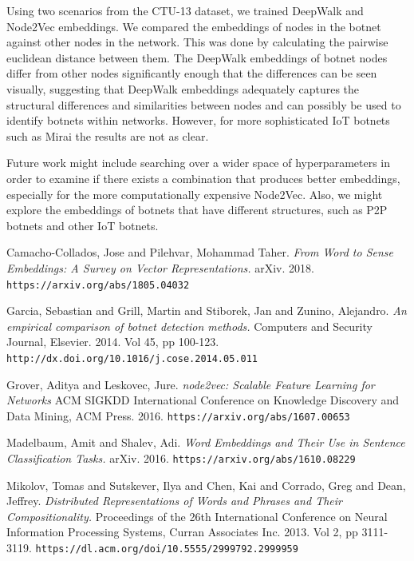 \documentclass[10pt]{article}
\begin{document}
\begin{multicols}{2}
Using two scenarios from the CTU-13 dataset, we trained DeepWalk and Node2Vec embeddings. We compared the embeddings of nodes in the botnet against other nodes in the network. This was done by calculating the pairwise euclidean distance between them. The DeepWalk embeddings of botnet nodes differ from other nodes significantly enough that the differences can be seen visually, suggesting that DeepWalk embeddings adequately captures the structural differences and similarities between nodes and can possibly be used to identify botnets within networks. However, for more sophisticated IoT botnets such as Mirai the results are not as clear. \newline

Future work might include searching over a wider space of hyperparameters in order to examine if there exists a combination that produces better embeddings, especially for the more computationally expensive Node2Vec. Also, we might explore the embeddings of botnets that have different structures, such as P2P botnets and other IoT botnets. 

\begin{thebibliography}{5}

Camacho-Collados, Jose and Pilehvar, Mohammad Taher.
\textit{From Word to Sense Embeddings: A Survey on Vector Representations.}
arXiv. 2018.
\texttt{https://arxiv.org/abs/1805.04032}

Garcia, Sebastian and Grill, Martin and Stiborek, Jan and Zunino, Alejandro.
\textit{An empirical comparison of botnet detection methods.}
Computers and Security Journal, Elsevier. 2014. Vol 45, pp 100-123.
\texttt{http://dx.doi.org/10.1016/j.cose.2014.05.011}

Grover, Aditya and Leskovec, Jure.
\textit{node2vec: Scalable Feature Learning for Networks}
ACM SIGKDD International Conference on Knowledge Discovery and Data Mining, ACM Press. 2016.
\texttt{https://arxiv.org/abs/1607.00653}

Madelbaum, Amit and Shalev, Adi.
\textit{Word Embeddings and Their Use in Sentence Classification Tasks.}
arXiv. 2016. 
\texttt{https://arxiv.org/abs/1610.08229}

Mikolov, Tomas and Sutskever, Ilya and Chen, Kai and Corrado, Greg and Dean, Jeffrey.
\textit{Distributed Representations of Words and Phrases and Their Compositionality.}
Proceedings of the 26th International Conference on Neural Information Processing Systems, Curran Associates Inc. 2013. Vol 2, pp 3111-3119.
\texttt{https://dl.acm.org/doi/10.5555/2999792.2999959}


\end{thebibliography}
\end{multicols}
\end{document}
